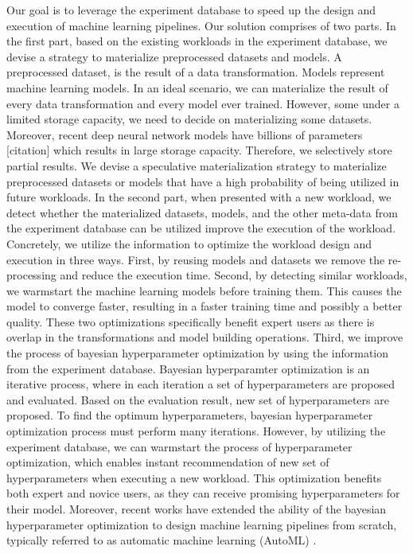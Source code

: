 Our goal is to leverage the experiment database to speed up the design and execution of machine learning pipelines.
Our solution comprises of two parts.
In the first part, based on the existing workloads in the experiment database, we devise a strategy to materialize preprocessed datasets and models.
A preprocessed dataset, is the result of a data transformation.
Models represent machine learning models.
In an ideal scenario, we can materialize the result of every data transformation and every model ever trained.
However, some under a limited storage capacity, we need to decide on materializing some datasets.
Moreover, recent deep neural network models have billions of parameters [citation] which results in large storage capacity.
Therefore, we selectively store partial results.
We devise a speculative materialization strategy to materialize preprocessed datasets or models that have a high probability of being utilized in future workloads.
In the second part, when presented with a new workload, we detect whether the materialized datasets, models, and the other meta-data from the experiment database can be utilized improve the execution of the workload.
Concretely, we utilize the information to optimize the workload design and execution in three ways.
First, by reusing models and datasets we remove the re-processing and reduce the execution time.
Second, by detecting similar workloads, we warmstart the machine learning models before training them.
This causes the model to converge faster, resulting in a faster training time and possibly a better quality.
These two optimizations specifically benefit expert users as there is overlap in the transformations and model building operations.
Third, we improve the process of bayesian hyperparameter  optimization \cite{bergstra2013making, hutter2011sequential, snoek2012practical} by using the information from the experiment database.
Bayesian hyperparamter optimization is an iterative process, where in each iteration a set of hyperparameters are proposed and evaluated.
Based on the evaluation result, new set of hyperparameters are proposed.
To find the optimum hyperparameters, bayesian hyperparameter optimization process must perform many iterations.
However, by utilizing the experiment database, we can warmstart the process of hyperparameter optimization, which enables instant recommendation of new set of hyperparameters when executing a new workload.
This optimization benefits both expert and novice users, as they can receive promising hyperparameters for their model.
Moreover, recent works have extended the ability of the bayesian hyperparameter optimization to design machine learning pipelines from scratch, typically referred to as automatic machine learning (AutoML) \cite{Feurer15} .
